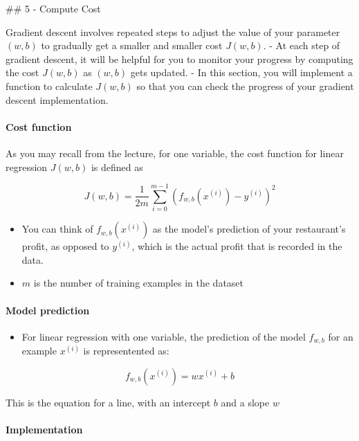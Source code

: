 \documentclass[11pt]{article}
\providecommand{\tightlist}{%
      \setlength{\itemsep}{0pt}\setlength{\parskip}{0pt}}
\begin{document}
    \#\# 5 - Compute Cost

Gradient descent involves repeated steps to adjust the value of your
parameter \((w,b)\) to gradually get a smaller and smaller cost
\(J(w,b)\). - At each step of gradient descent, it will be helpful for
you to monitor your progress by computing the cost \(J(w,b)\) as
\((w,b)\) gets updated. - In this section, you will implement a function
to calculate \(J(w,b)\) so that you can check the progress of your
gradient descent implementation.

\hypertarget{cost-function}{%
\paragraph{Cost function}\label{cost-function}}

As you may recall from the lecture, for one variable, the cost function
for linear regression \(J(w,b)\) is defined as

\[J(w,b) = \frac{1}{2m} \sum\limits_{i = 0}^{m-1} (f_{w,b}(x^{(i)}) - y^{(i)})^2\]

\begin{itemize}
\tightlist
\item
  You can think of \(f_{w,b}(x^{(i)})\) as the model's prediction of
  your restaurant's profit, as opposed to \(y^{(i)}\), which is the
  actual profit that is recorded in the data.
\item
  \(m\) is the number of training examples in the dataset
\end{itemize}

\hypertarget{model-prediction}{%
\paragraph{Model prediction}\label{model-prediction}}

\begin{itemize}
\tightlist
\item
  For linear regression with one variable, the prediction of the model
  \(f_{w,b}\) for an example \(x^{(i)}\) is representented as:
\end{itemize}

\[ f_{w,b}(x^{(i)}) = wx^{(i)} + b\]

This is the equation for a line, with an intercept \(b\) and a slope
\(w\)

\hypertarget{implementation}{%
\paragraph{Implementation}\label{implementation}}
\end{document}
